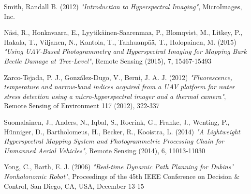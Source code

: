 \begin{thebibliography}{25}
	
	Smith, Randall B. (2012)
	\emph{"Introduction to Hyperspectral Imaging"},
	MicroImages, Inc.
	
	Näsi, R., Honkavaara, E., Lyytikäinen-Saarenmaa, P., Blomqvist, M., Litkey, P., Hakala, T., Viljanen, N., Kantola, T., Tanhuanpää, T., Holopainen, M. (2015)
	\emph{"Using UAV-Based Photogrammetry and Hyperspectral Imaging for Mapping Bark Beetle Damage at Tree-Level"},
	Remote Sensing (2015), 7, 15467-15493
	
	Zarco-Tejada, P. J., González-Dugo, V., Berni, J. A. J. (2012)
	\emph{"Fluorescence, temperature and narrow-band indices acquired from a UAV platform for water stress detection using a micro-hyperspectral imager and a thermal camera"},
	Remote Sensing of Environment 117 (2012), 322-337
	
	Suomalainen, J., Anders, N., Iqbal, S., Roerink, G., Franke, J., Wenting, P., Hünniger, D., Bartholomeus, H., Becker, R., Kooistra, L. (2014)
	\emph{"A Lightweight Hyperspectral Mapping System and Photogrammetric Processing Chain for Unmanned Aerial Vehicles"},
	Remote Sensing (2014), 6, 11013-11030
	
	
	Yong, C., Barth, E. J. (2006)
	\emph{"Real-time Dynamic Path Planning for Dubins' Nonholonomic Robot"},
	Proceedings of the 45th IEEE Conference on Decision \& Control, San Diego, CA, USA, December 13-15
	
\end{thebibliography}